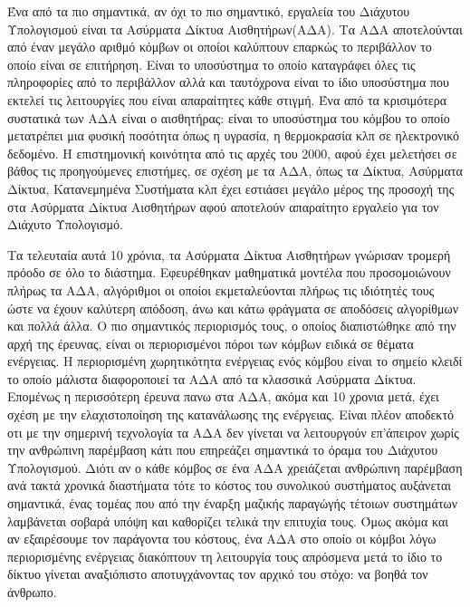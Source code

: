 Ένα από τα πιο σημαντικά, αν όχι το πιο σημαντικό, εργαλεία του Διάχυτου Υπολογισμού είναι τα Ασύρματα Δίκτυα Αισθητήρων(ΑΔΑ).
Τα ΑΔΑ αποτελούνται από έναν μεγάλο αριθμό κόμβων οι οποίοι καλύπτουν επαρκώς το περιβάλλον το οποίο είναι σε επιτήρηση.
Είναι το υποσύστημα το οποίο καταγράφει όλες τις πληροφορίες από το περιβάλλον αλλά και ταυτόχρονα είναι το ίδιο υποσύστημα που εκτελεί τις λειτουργίες που είναι
απαραίτητες κάθε στιγμή.
Ένα από τα κρισιμότερα συστατικά των ΑΔΑ είναι ο αισθητήρας: είναι το υποσύστημα του κόμβου το οποίο μετατρέπει μια φυσική ποσότητα όπως η υγρασία, η θερμοκρασία
κλπ σε ηλεκτρονικό δεδομένο.
Η επιστημονική κοινότητα από τις αρχές του 2000, αφού έχει μελετήσει σε βάθος τις προηγούμενες επιστήμες, σε σχέση με τα ΑΔΑ, όπως τα Δίκτυα, Ασύρματα Δίκτυα,
Κατανεμημένα Συστήματα κλπ έχει εστιάσει μεγάλο μέρος της προσοχή της στα Ασύρματα Δίκτυα Αισθητήρων αφού αποτελούν απαραίτητο εργαλείο για τον Διάχυτο Υπολογισμό.


Τα τελευταία αυτά 10 χρόνια, τα Ασύρματα Δίκτυα Αισθητήρων γνώρισαν τρομερή πρόοδο σε όλο το διάστημα. Εφευρέθηκαν μαθηματικά μοντέλα που προσομοιώνουν πλήρως τα
ΑΔΑ\cite{geometric_graphs}, αλγόριθμοι οι οποίοι εκμεταλεύονται πλήρως τις ιδιότητές τους ώστε να έχουν καλύτερη απόδοση, άνω και κάτω φράγματα σε αποδόσεις
αλγορίθμων και πολλά άλλα.
Ο πιο σημαντικός περιορισμός τους, ο οποίος διαπιστώθηκε από την αρχή της έρευνας, είναι οι περιορισμένοι πόροι των κόμβων ειδικά σε θέματα ενέργειας.
Η περιορισμένη χωρητικότητα ενέργειας ενός κόμβου είναι το σημείο κλειδί το οποίο μάλιστα διαφοροποιεί τα ΑΔΑ από τα κλασσικά Ασύρματα Δίκτυα.
Επομένως η περισσότερη έρευνα πανω στα ΑΔΑ, ακόμα και 10 χρονια μετά, έχει σχέση με την ελαχιστοποίηση της κατανάλωσης της ενέργειας. Είναι πλέον αποδεκτό οτι με την
σημερινή τεχνολογία τα ΑΔΑ δεν γίνεται να λειτουργούν επ'άπειρον χωρίς την ανθρώπινη παρέμβαση κάτι που επηρεάζει σημαντικά το όραμα του Διάχυτου Υπολογισμού.
Διότι αν ο κάθε κόμβος σε ένα ΑΔΑ χρειάζεται ανθρώπινη παρέμβαση ανά τακτά χρονικά διαστήματα τότε το κόστος του συνολικού συστήματος αυξάνεται σημαντικά, ένας τομέας
που από την έναρξη μαζικής παραγώγής τέτοιων συστημάτων λαμβάνεται σοβαρά υπόψη και καθορίζει τελικά την επιτυχία τους. Όμως ακόμα και αν εξαιρέσουμε τον παράγοντα
του κόστους, ένα ΑΔΑ στο οποίο οι κόμβοι λόγω περιορισμένης ενέργειας διακόπτουν τη λειτουργία τους απρόσμενα μετά το ίδιο το δίκτυο γίνεται αναξιόπιστο
αποτυγχάνοντας τον αρχικό του στόχο: να βοηθά τον άνθρωπο.

